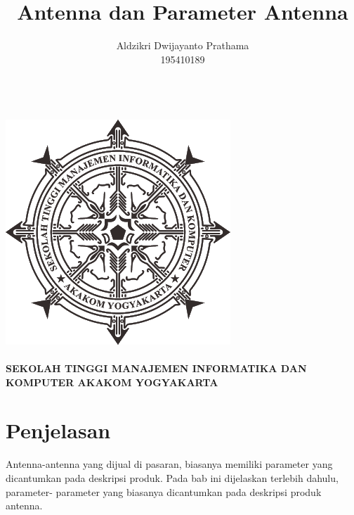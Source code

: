 \documentclass[a4paper,12pt]{article}
\begin{document}
\title{Antenna dan Parameter Antenna}
\author{Aldzikri Dwijayanto Prathama 
	\\195410189}
\makeatletter
\begin{titlepage}
	\begin{center}
		{\huge \bfseries \@title }\\[14ex]
		\includegraphics[scale=.8]{logo}\\[4ex]
		{\large \@author}\\[20ex]
		{\large \bfseries {SEKOLAH TINGGI MANAJEMEN INFORMATIKA DAN KOMPUTER
				AKAKOM YOGYAKARTA}}
	\end{center}


\end{titlepage}
\makeatother
\newpage
\section{Penjelasan}
Antenna-antenna yang dijual di pasaran, biasanya memiliki parameter yang dicantumkan pada deskripsi produk. Pada bab ini dijelaskan terlebih dahulu, parameter-
parameter yang biasanya dicantumkan pada deskripsi produk antenna.
\end{document}
